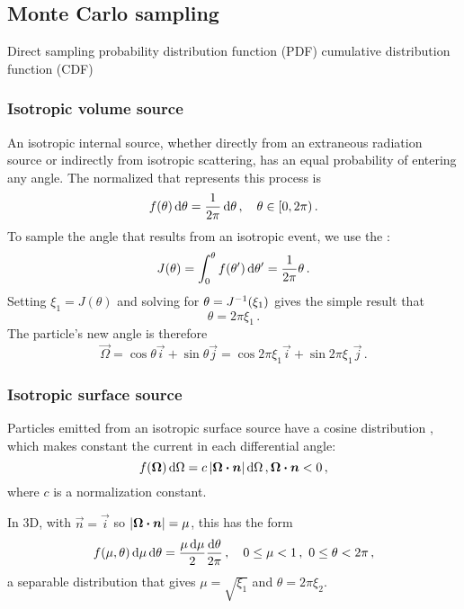 \clearpage
\subsection{Monte Carlo sampling}
\cite{Lew1984,Bro2004a}
Direct sampling 
probability distribution function (PDF)
cumulative distribution function (CDF)

\subsubsection{Isotropic volume source}
An isotropic internal source, whether directly from an extraneous radiation
source or indirectly from isotropic scattering, has an equal probability of
entering any angle. The normalized  that
represents this process is
\begin{equation*}
  f(\theta) \mathop{}\!\mathrm{d} \theta = \frac{1}{2\pi} \mathop{}\!\mathrm{d} \theta\,, \quad \theta \in [0, 2\pi)\,.
\end{equation*}
To sample the angle that results from an isotropic event, we use the :
\begin{equation*}
  J(\theta) = \int_{0}^{\theta} f(\theta') \mathop{}\!\mathrm{d} \theta' = \frac{1}{2\pi}
  \theta\,.
\end{equation*}
Setting $\xi_1 = J(\theta)$ and solving for $\theta = J^{-1}(\xi_1)$ gives the
simple result that
\begin{equation*}
  \theta = 2\pi \xi_1\,.
\end{equation*}
The particle's new angle is therefore
\begin{equation*}
  \vec{\Omega} = \cos \theta \vec{i} + \sin \theta \vec{j}
  = \cos 2\pi\xi_1\vec{i} + \sin 2\pi\xi_1 \vec{j}\,.
\end{equation*}

\subsubsection{Isotropic surface source}
Particles emitted from an isotropic surface source have a cosine distribution
\cite{Gre2002}, which makes constant the current in each differential
angle:
\begin{equation}\label{eq:surfaceSource}
  f(\bm{\Omega}) \mathop{}\!\mathrm{d} \Omega = c \left| \bm{\Omega}\bm{\cdot} \bm{n} \right| \mathop{}\!\mathrm{d} \Omega \,,
\bm{\Omega}\bm{\cdot} \bm{n} < 0 \,,
\end{equation}
where $c$ is a normalization constant.

In 3D, with $\vec{n}=\vec{i}$ so $\left| \bm{\Omega}\bm{\cdot} \bm{n} \right|=\mu$, this has
the form
\begin{equation*}
  f(\mu, \theta) \mathop{}\!\mathrm{d}\mu \mathop{}\!\mathrm{d}\theta = \frac{\mu \mathop{}\!\mathrm{d}\mu}{2} \frac{\mathop{}\!\mathrm{d}\theta}{2\pi}
  \,,\quad 0 \le \mu < 1\,,\ 0 \le \theta < 2\pi\,,
\end{equation*}
a separable distribution that gives $\mu=\sqrt{\xi_1}$ and $\theta=2\pi \xi_2$.

